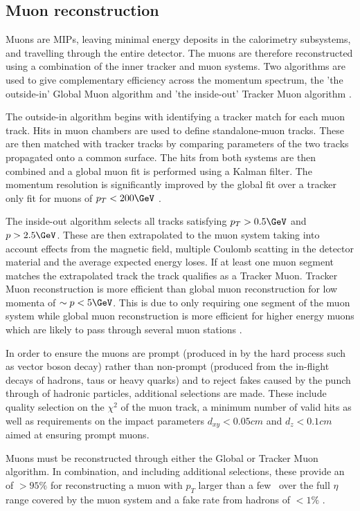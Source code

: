 \subsection{Muon reconstruction}

Muons are MIPs, leaving minimal energy deposits in the calorimetry subsystems, and travelling through
the entire detector. The muons are therefore reconstructed using a combination of the inner tracker
and muon systems. Two algorithms are used to give complementary efficiency across the momentum spectrum,
the 'the outside-in' Global Muon algorithm and 'the inside-out' Tracker 
Muon algorithm \cite{muon_reco}.

The outside-in algorithm begins with identifying a tracker match for each muon track. Hits in muon
chambers are used to define standalone-muon tracks. These are then matched with tracker tracks
by comparing parameters of the two tracks propagated onto a common surface. The hits from
both systems are then combined and a global muon fit is performed using a Kalman filter. The momentum 
resolution is significantly improved by the global fit over a tracker only fit for muons of $p_T < 200\GeV$
 \cite{CMS,muon_reco_cosmic}. 

The inside-out algorithm selects all tracks satisfying $p_T > 0.5\GeV$ and $p > 2.5\GeV$. These are then 
extrapolated to the muon system taking into account effects from the magnetic field, multiple Coulomb scatting
in the detector material and the average expected energy loses. If at least one muon segment matches 
the extrapolated track the track qualifies as a Tracker Muon. Tracker Muon reconstruction is more efficient
than global muon reconstruction for low momenta of $\sim p< 5\GeV$. This is due to only requiring one segment
of the muon system while global muon reconstruction is more efficient for higher energy muons which are likely
to pass through several muon stations \cite{muon_reco}.

In order to ensure the muons are prompt (produced in by the hard process such as vector boson decay) rather
than non-prompt (produced from the in-flight decays of hadrons, taus or heavy quarks) and to reject fakes
caused by the punch through of hadronic particles, additional selections are made. These include quality
selection on the $\chi^2$ of the muon track, a minimum number of valid hits as well as requirements
on the impact parameters $d_{xy} < 0.05 cm$ and $d_{z} < 0.1 cm$ aimed at ensuring prompt muons.

Muons must be reconstructed through either the Global or Tracker Muon algorithm. In combination, and
including additional selections, these provide an of $>95\%$ for
reconstructing a muon with $p_T$ larger than a few \GeV~over the full $\eta$ range covered by the
muon system and a fake rate from hadrons of $<1\%$ \cite{muon_reco}.




